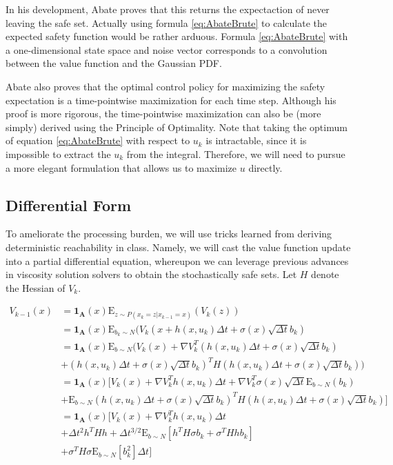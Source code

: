 \documentclass[a4paper]{article}
\begin{document}
In his development, Abate proves that this returns the expectaction of never leaving the safe set.
Actually using formula \ref{eq:AbateBrute} to calculate the expected safety function would be rather arduous.
Formula \ref{eq:AbateBrute} with a one-dimensional state space and noise vector corresponds to a convolution between the value function and the Gaussian PDF.

Abate also proves that the optimal control policy for maximizing the safety expectation is a time-pointwise maximization for each time step.
Although his proof is more rigorous, the time-pointwise maximization can also be (more simply) derived using the Principle of Optimality.
Note that taking the optimum of equation \ref{eq:AbateBrute} with respect to $u_k$ is intractable, since it is impossible to extract the $u_k$ from the integral.
Therefore, we will need to pursue a more elegant formulation that allows us to maximize $u$ directly.

\subsection{Differential Form}
To ameliorate the processing burden, we will use tricks learned from deriving deterministic reachability in class.
Namely, we will cast the value function update into a partial differential equation, whereupon we can leverage previous advances in viscosity solution solvers to obtain the stochastically safe sets.
Let $H$ denote the Hessian of $V_k$.

\begin{align*}
V_{k-1}(x) & = \mathbf{1_A}(x) \mathrm{E}_{z \sim P(x_k = z | x_{k-1}=x)} (V_k(z))
\\ & = \mathbf{1_A}(x) \mathrm{E}_{b_k\sim N} (V_k( x + h(x,u_k) \Delta t + \sigma(x) \sqrt{\Delta t} b_k )
\\ & = \mathbf{1_A}(x) \mathrm{E}_{b\sim N} (V_k( x ) + \nabla V_k^T (h(x,u_k) \Delta t + \sigma(x) \sqrt{\Delta t} b_k)
\\ & + (h(x,u_k) \Delta t + \sigma(x) \sqrt{\Delta t} b_k)^T H (h(x,u_k) \Delta t + \sigma(x) \sqrt{\Delta t} b_k)    )
\\ & = \mathbf{1_A}(x) [ V_k( x ) + \nabla V_k^T h(x,u_k) \Delta t + \nabla V_k^T \sigma(x) \sqrt{\Delta t} \mathrm{E}_{b\sim N}(b_k)
\\ & + \mathrm{E}_{b\sim N} (h(x,u_k) \Delta t + \sigma(x) \sqrt{\Delta t} b_k)^T H (h(x,u_k) \Delta t + \sigma(x) \sqrt{\Delta t} b_k) ]
\\ & = \mathbf{1_A}(x) [ V_k( x ) + \nabla V_k^T h(x,u_k) \Delta t
\\ & + \Delta t^2 h^T H h + \Delta t^{3/2} \mathrm{E}_{b\sim N} [ h^T H \sigma b_k + \sigma^T H h b_k]
\\ & + \sigma^T H \sigma \mathrm{E}_{b\sim N} [b_k^2] \Delta t ]
\end{align*}
\end{document}
